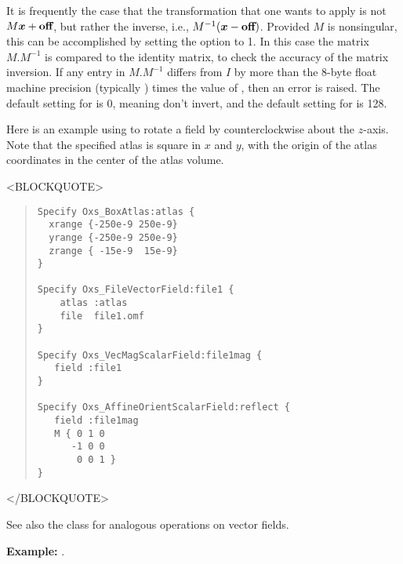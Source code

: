 \begin{description}
It is frequently the case that the transformation that one wants to
apply is not $M\mbox{\boldmath$x$}+\textbf{off}$, but rather the
inverse, i.e., $M^{-1}(\mbox{\boldmath$x$}-\textbf{off})$.  Provided $M$
is nonsingular, this can be accomplished by setting the
 option to 1.  In this case the matrix $M.M^{-1}$ is
compared to the identity matrix, to check the accuracy of the matrix
inversion.  If any entry in $M.M^{-1}$ differs from $I$ by more than the
8-byte float machine precision (typically
) times the value of
, then an error is raised. The default setting
for  is 0, meaning don't invert,
and the default setting for  is 128.

Here is an example using  to rotate a
field by  counterclockwise about the
$z$-axis.  Note that the specified atlas is square in $x$ and $y$, with
the origin of the atlas coordinates in the center of the atlas volume.
\begin{rawhtml}<BLOCKQUOTE>\end{rawhtml}
\begin{quote}
\begin{verbatim}
Specify Oxs_BoxAtlas:atlas {
  xrange {-250e-9 250e-9}
  yrange {-250e-9 250e-9}
  zrange { -15e-9  15e-9}
}

Specify Oxs_FileVectorField:file1 {
    atlas :atlas
    file  file1.omf
}

Specify Oxs_VecMagScalarField:file1mag {
   field :file1
}

Specify Oxs_AffineOrientScalarField:reflect {
   field :file1mag
   M { 0 1 0
      -1 0 0
       0 0 1 }
}
\end{verbatim}
\end{quote}
\begin{rawhtml}</BLOCKQUOTE>\end{rawhtml}

See also the
class for
analogous operations on vector fields.

\textbf{Example:} .


\end{description}
